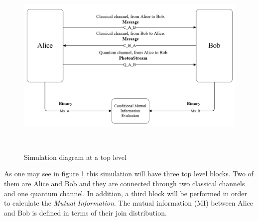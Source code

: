 \begin{figure}[H]
	\centering
	\includegraphics[width=1.0\textwidth, height=9cm]{./sdf/qokd_with_discrete_variables/figures/Simulation_diagram_top.png}
	\caption{Simulation diagram at a top level}\label{toplevelsimulation}
\end{figure}

As one may see in figure \ref{toplevelsimulation} this simulation will have three top level blocks. Two of them are Alice and Bob and they are connected through two classical channels and one quantum channel. In addition, a third block will be performed in order to calculate the \textit{Mutual Information}. The mutual information (MI) between Alice and Bob is defined in terms of their join distribution.


